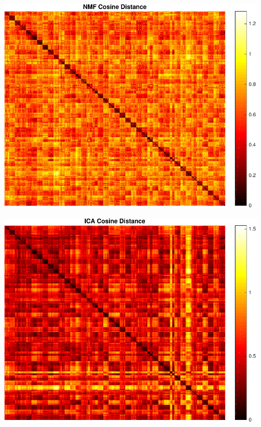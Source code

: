 \begin{center}
\begin{minipage}[t]{\linewidth}
\center
{
\includegraphics[width=\MyFactor\textwidth]{Img/nmfcos} 
}
\end{minipage}
\medskip
\end{center}

\begin{center}
\begin{minipage}[t]{\linewidth}
\center
{
\includegraphics[width=\MyFactor\textwidth]{Img/icacos} 
}
\end{minipage}
\medskip
\end{center}


